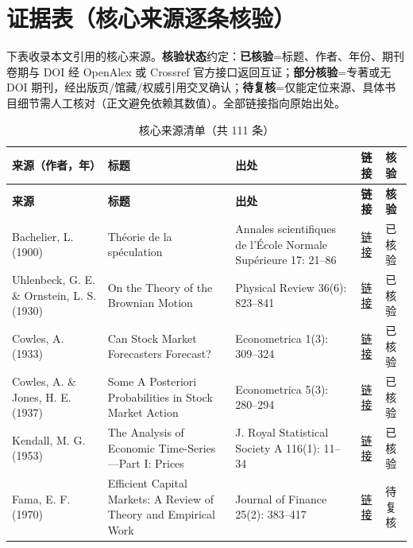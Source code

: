 \section{证据表（核心来源逐条核验）}\label{sec:evidence}

下表收录本文引用的核心来源。\textbf{核验状态}约定：\textbf{已核验}=标题、作者、年份、期刊卷期与 DOI 经 OpenAlex 或 Crossref 官方接口返回互证；\textbf{部分核验}=专著或无 DOI 期刊，经出版页/馆藏/权威引用交叉确认；\textbf{待复核}=仅能定位来源、具体书目细节需人工核对（正文避免依赖其数值）。全部链接指向原始出处。

\begin{longtable}{@{}>{\raggedright\arraybackslash}p{2.55cm}>{\raggedright\arraybackslash}p{4.7cm}>{\raggedright\arraybackslash}p{2.7cm}>{\raggedright\arraybackslash}p{1.9cm}>{\raggedright\arraybackslash}p{1.45cm}@{}}
\caption{核心来源清单（共 111 条）}\label{tab:evidence}\\ 
\toprule
\textbf{来源（作者，年）} & \textbf{标题} & \textbf{出处} & \textbf{链接} & \textbf{核验} \\
\midrule
\endfirsthead
\toprule \textbf{来源} & \textbf{标题} & \textbf{出处} & \textbf{链接} & \textbf{核验} \\ \midrule \endhead
\bottomrule \endlastfoot
Bachelier, L. (1900) & Théorie de la spéculation & Annales scientifiques de l'École Normale Supérieure 17: 21--86 & \href{https://doi.org/10.24033/asens.476}{链接} & 已核验 \\
Uhlenbeck, G. E. \& Ornstein, L. S. (1930) & On the Theory of the Brownian Motion & Physical Review 36(6): 823--841 & \href{https://doi.org/10.1103/PhysRev.36.823}{链接} & 已核验 \\
Cowles, A. (1933) & Can Stock Market Forecasters Forecast? & Econometrica 1(3): 309--324 & \href{https://doi.org/10.2307/1907042}{链接} & 已核验 \\
Cowles, A. \& Jones, H. E. (1937) & Some A Posteriori Probabilities in Stock Market Action & Econometrica 5(3): 280--294 & \href{https://doi.org/10.2307/1905515}{链接} & 已核验 \\
Kendall, M. G. (1953) & The Analysis of Economic Time-Series---Part I: Prices & J. Royal Statistical Society A 116(1): 11--34 & \href{https://doi.org/10.2307/2980947}{链接} & 已核验 \\
Fama, E. F. (1970) & Efficient Capital Markets: A Review of Theory and Empirical Work & Journal of Finance 25(2): 383--417 & \href{https://doi.org/10.1111/j.1540-6261.1970.tb00518.x}{链接} & 待复核 \\

\end{longtable}
